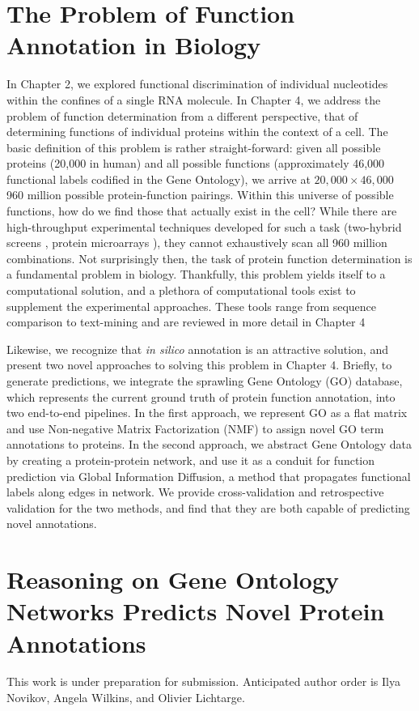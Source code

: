 \documentclass[12pt,a4paper]{report}
\begin{document}
\chapter[The Problem of Function Annotation in Biology]{\LARGE The Problem of Function Annotation in Biology}

In Chapter 2, we explored functional discrimination of individual nucleotides within the confines of a single RNA molecule. In Chapter 4, we address the problem of function determination from a different perspective, that of determining functions of individual proteins within the context of a cell. The basic definition of this problem is rather straight-forward: given all possible proteins (20,000 in human) and all possible functions (approximately 46,000 functional labels codified in the Gene Ontology), we arrive at $20,000 \times 46,000$ 960 million possible protein-function pairings. Within this universe of possible functions, how do we find those that actually exist in the cell? While there are high-throughput experimental techniques developed for such a task (two-hybrid screens \cite{Bruckner_yeast2h}, protein microarrays \cite{Sutandy2013_microarrays}), they cannot exhaustively scan all 960 million combinations. Not surprisingly then, the task of protein function determination is a fundamental problem in biology. Thankfully, this problem yields itself to a computational solution, and a plethora of computational tools exist to supplement the experimental approaches. These tools range from sequence comparison to text-mining and are reviewed in more detail in Chapter 4

Likewise, we recognize that \textit{in silico} annotation is an attractive solution, and present two novel approaches to solving this problem in Chapter 4. Briefly, to generate predictions, we integrate the sprawling Gene Ontology (GO) database, which represents the current ground truth of protein function annotation, into two end-to-end pipelines. In the first approach, we represent GO as a flat matrix and use Non-negative Matrix Factorization (NMF) to assign novel GO term annotations to proteins. In the second approach, we abstract Gene Ontology data by creating a protein-protein network, and use it as a conduit for function prediction via Global Information Diffusion, a method that propagates functional labels along edges in network. We provide cross-validation and retrospective validation for the two methods, and find that they are both capable of predicting novel annotations.

\chapter[Reasoning on Gene Ontology Networks Predicts Novel Protein Annotations]{\LARGE Reasoning on Gene Ontology Networks Predicts Novel Protein Annotations}
This work is under preparation for submission. Anticipated author order is Ilya Novikov, Angela Wilkins, and Olivier Lichtarge.
\end{document}
